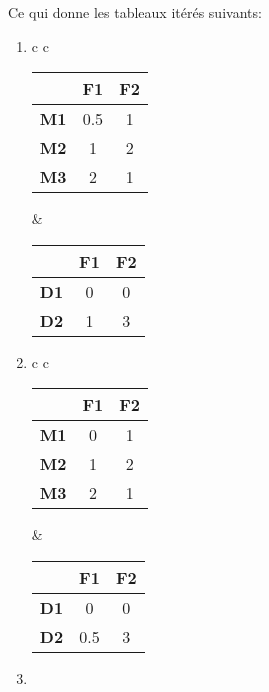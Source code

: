 Ce qui donne les tableaux itérés suivants:
\begin{enumerate}
\item
\begin{table}[H]
\centering
\begin{tabular}{c c}

\begin{tabular}{|c|c|c|}
\hline
\textbf{} & \textbf{F1} & \textbf{F2} \\
\hline
\textbf{M1} & 0.5 & 1 \\
\textbf{M2} & 1 & 2 \\
\textbf{M3} & 2 & 1 \\
\hline
\end{tabular}
&
\begin{tabular}{|c|c|c|}
\hline
\textbf{} & \textbf{F1} & \textbf{F2} \\
\hline
\textbf{D1} & 0 & 0 \\
\textbf{D2} & 1 & 3 \\
\hline
\end{tabular}

\end{tabular}
\end{table}

\item
\begin{table}[H]
\centering
\begin{tabular}{c c}

\begin{tabular}{|c|c|c|}
\hline
\textbf{} & \textbf{F1} & \textbf{F2} \\
\hline
\textbf{M1} & 0 & 1 \\
\textbf{M2} & 1 & 2 \\
\textbf{M3} & 2 & 1 \\
\hline
\end{tabular}
&
\begin{tabular}{|c|c|c|}
\hline
\textbf{} & \textbf{F1} & \textbf{F2} \\
\hline
\textbf{D1} & 0 & 0 \\
\textbf{D2} & 0.5 & 3 \\
\hline
\end{tabular}

\end{tabular}
\end{table}

\item
\begin{table}[h]
\centering
\begin{tabular}{c c}


\end{tabular}
\end{table}
\end{enumerate}
